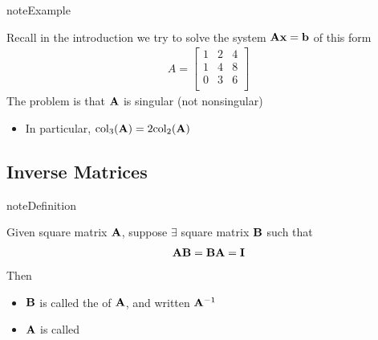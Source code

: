 \documentclass[letterpaper,10pt,english]{jupyterBook}
\begin{document}
\begin{sphinxadmonition}{note}{Example}

\sphinxAtStartPar
Recall in the introduction we try to solve the system \({\bf A} {\bf x} = {\bf b}\)
of this form
\begin{equation*}
\begin{split}
A = \left[\begin{array}{cccc}
1 & 2 & 4 \\
1 & 4 & 8 \\
0 & 3 & 6 \\
\end{array}
\right]
\end{split}
\end{equation*}
\sphinxAtStartPar
The problem is that \({\bf A}\) is singular (not nonsingular)
\begin{itemize}
\item {} 
\sphinxAtStartPar
In particular, \(\mathrm{col}_3({\bf A}) = 2 \mathrm{col}_2({\bf A})\)

\end{itemize}
\end{sphinxadmonition}


\subsection{Inverse Matrices}
\label{\detokenize{05.linear_algebra:inverse-matrices}}
\begin{sphinxadmonition}{note}{Definition}

\sphinxAtStartPar
Given square matrix \({\bf A}\), suppose \(\exists\) square matrix \({\bf B}\) such that
\begin{equation*}
\begin{split}{\bf A} {\bf B} = {\bf B} {\bf A} = {\bf I}\end{split}
\end{equation*}
\sphinxAtStartPar
Then
\begin{itemize}
\item {} 
\sphinxAtStartPar
\({\bf B}\) is called the  of \({\bf A}\), and written \({\bf A}^{-1}\)

\item {} 
\sphinxAtStartPar
\({\bf A}\) is called 

\end{itemize}
\end{sphinxadmonition}
\end{document}
